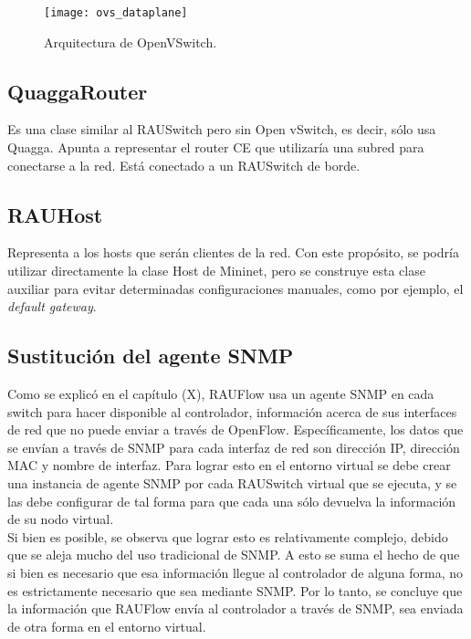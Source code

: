 \begin{figure}[t]
	\caption{Arquitectura de OpenVSwitch.}
	\texttt{[image: ovs\_dataplane]}
	\centering
	\label{fig:ovs_dataplane}
\end{figure}

\subsection{QuaggaRouter}
Es una clase similar al RAUSwitch pero sin Open vSwitch, es decir, sólo usa Quagga. Apunta a representar el router CE que utilizaría una subred para conectarse a la red. Está conectado a un RAUSwitch de borde.

\subsection{RAUHost}
Representa a los hosts que serán clientes de la red. Con este propósito, se podría utilizar directamente la clase Host de Mininet, pero se construye esta clase auxiliar para evitar determinadas configuraciones manuales, como por ejemplo, el \textit{default gateway}.

\subsection{Sustitución del agente SNMP}
Como se explicó en el capítulo (X), RAUFlow usa un agente SNMP en cada switch para hacer disponible al controlador, información acerca de sus interfaces de red que no puede enviar a través de OpenFlow. Específicamente, los datos que se envían a través de SNMP para cada interfaz de red son dirección IP, dirección MAC y nombre de interfaz. Para lograr esto en el entorno virtual se debe crear una instancia de agente SNMP por cada RAUSwitch virtual que se ejecuta, y se las debe configurar de tal forma para que cada una sólo devuelva la información de su nodo virtual. \\
Si bien es posible, se observa que lograr esto es relativamente complejo, debido que se aleja mucho del uso tradicional de SNMP. A esto se suma el hecho de que si bien es necesario que esa información llegue al controlador de alguna forma, no es estrictamente necesario que sea mediante SNMP. Por lo tanto, se concluye que la información que RAUFlow envía al controlador a través de SNMP, sea enviada de otra forma en el entorno virtual.

